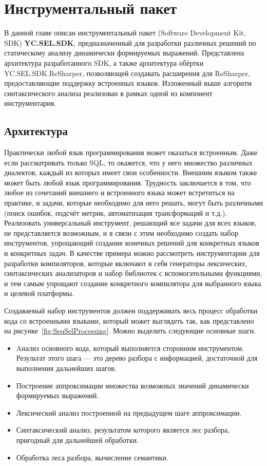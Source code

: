 \chapter{Инструментальный пакет} \label{relWorks}

В данной главе описан инструментальный пакет (Software Development Kit, SDK) \textbf{YC.SEL.SDK}, предназначенный для разработки различных решений по статическому анализу динамически формируемых выражений. Представлена архитектура разработанного SDK, а также архитектура обёртки YC.SEL.SDK.ReSharper, позволяющей создавать расширения для ReSharper, предоставляющие поддержку встроенных языков. Изложенный выше алгоритм синтаксического анализа реализован в рамках одной из компонент инструментария.

\section{Архитектура}

Практически любой язык программирования может оказаться встроенным. Даже если рассматривать только SQL, то окажется, что у него множество различных диалектов, каждый из которых имеет свои особенности. Внешним языком также может быть любой язык программирования. Трудность заключается в том, что  любое из сочетаний внешнего и встроенного языка может встретиться на практике, и задачи, которые необходимо для него решать, могут быть различными (поиск ошибок, подсчёт метрик, автоматизация трансформаций и т.д.). Реализовать универсальный инструмент, решающий все задачи для всех языков, не представляется возможным, и в связи с этим необходимо создать набор инструментов, упрощающий создание конечных решений для конкретных языков и конкретных задач. В качестве примера можно рассмотреть инструментарии для разработки компиляторов, которые включают в себя генераторы лексических, синтаксических анализаторов и набор библиотек с вспомогательными функциями, и тем самым упрощают создание конкретного компилятора для выбранного языка и целевой платформы.

Создаваемый набор инструментов должен поддерживать весь процесс обработки кода со встроенными языками, который может выглядеть так, как представлено на рисунке~\ref{fig:SeqSelProcessing}. Можно выделить следующие основные шаги.
\begin{itemize}
    \item Aнализ основного кода, который выполняется сторонним инструментом. Результат этого шага --- это дерево разбора с информацией, достаточной для выполнения дальнейших шагов.
    \item Построение аппроксимации множества возможных значений динамически формируемых выражений.
    \item Лексический анализ построенной на предыдущем шаге аппроксимации.
    \item Синтаксический анализ, результатом которого является лес разбора, пригодный для дальнейшей обработки.
    \item Обработка леса разбора, вычисление семантики.
\end{itemize}

